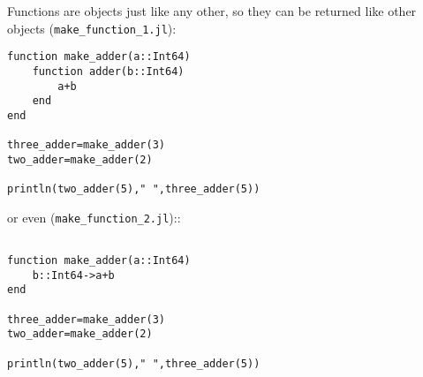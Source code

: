 \documentclass[11pt,a4paper]{scrartcl}
\begin{document}
Functions are objects just like any other, so they can be returned
like other objects (\texttt{make\_function\_1.jl}):
\begin{lstlisting}[numbers=right]
function make_adder(a::Int64)
    function adder(b::Int64)
        a+b
    end
end

three_adder=make_adder(3)
two_adder=make_adder(2)

println(two_adder(5)," ",three_adder(5))
\end{lstlisting}
or even (\texttt{make\_function\_2.jl})::
\begin{lstlisting}[numbers=right]

function make_adder(a::Int64)
    b::Int64->a+b
end

three_adder=make_adder(3)
two_adder=make_adder(2)

println(two_adder(5)," ",three_adder(5))
\end{lstlisting}
\end{document}
